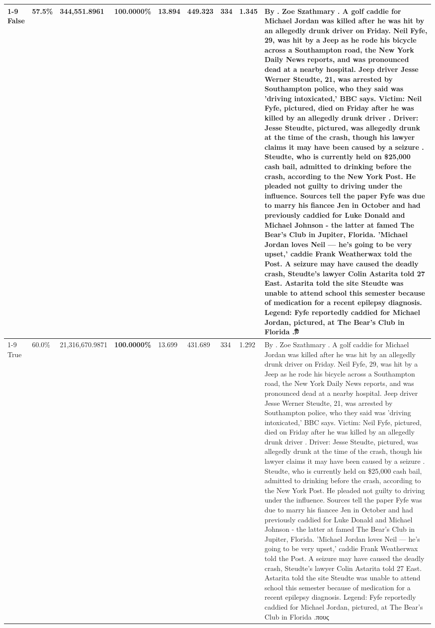 \begin{table}[H]
\begin{tabular}{lllrlllll}
\cline{1-9}
False & 57.5\% & 344,551.8961 & \bfseries \color{red} 100.0000\% & 13.894 & 449.323 & 334 & 1.345 & By . Zoe Szathmary . A golf caddie for Michael Jordan was killed after he was hit by an allegedly drunk driver on Friday. Neil Fyfe, 29, was hit by a Jeep as he rode his bicycle across a Southampton road, the New York Daily News reports, and was pronounced dead at a nearby hospital. Jeep driver Jesse Werner Steudte, 21, was arrested by Southampton police, who they said was 'driving intoxicated,' BBC says. Victim: Neil Fyfe, pictured, died on Friday after he was killed by an allegedly drunk driver . Driver: Jesse Steudte, pictured, was allegedly drunk at the time of the crash, though his lawyer claims it may have been caused by a seizure . Steudte, who is currently held on \$25,000 cash bail, admitted to drinking before the crash, according to the New York Post. He pleaded not guilty to driving under the influence. Sources tell the paper Fyfe was due to marry his fiancee Jen in October and had previously caddied for Luke Donald and Michael Johnson - the latter at famed The Bear's Club in Jupiter, Florida. 'Michael Jordan loves Neil — he’s going to be very upset,' caddie Frank Weatherwax told the Post. A seizure may have caused the deadly crash, Steudte's lawyer Colin Astarita told 27 East. Astarita told the site Steudte was unable to attend school this semester because of medication for a recent epilepsy diagnosis. Legend: Fyfe reportedly caddied for Michael Jordan, pictured, at The Bear's Club in Florida .টি \\
\cline{1-9}
True & 60.0\% & 21,316,670.9871 & \bfseries \color{red} 100.0000\% & 13.699 & 431.689 & 334 & 1.292 & By . Zoe Szathmary . A golf caddie for Michael Jordan was killed after he was hit by an allegedly drunk driver on Friday. Neil Fyfe, 29, was hit by a Jeep as he rode his bicycle across a Southampton road, the New York Daily News reports, and was pronounced dead at a nearby hospital. Jeep driver Jesse Werner Steudte, 21, was arrested by Southampton police, who they said was 'driving intoxicated,' BBC says. Victim: Neil Fyfe, pictured, died on Friday after he was killed by an allegedly drunk driver . Driver: Jesse Steudte, pictured, was allegedly drunk at the time of the crash, though his lawyer claims it may have been caused by a seizure . Steudte, who is currently held on \$25,000 cash bail, admitted to drinking before the crash, according to the New York Post. He pleaded not guilty to driving under the influence. Sources tell the paper Fyfe was due to marry his fiancee Jen in October and had previously caddied for Luke Donald and Michael Johnson - the latter at famed The Bear's Club in Jupiter, Florida. 'Michael Jordan loves Neil — he’s going to be very upset,' caddie Frank Weatherwax told the Post. A seizure may have caused the deadly crash, Steudte's lawyer Colin Astarita told 27 East. Astarita told the site Steudte was unable to attend school this semester because of medication for a recent epilepsy diagnosis. Legend: Fyfe reportedly caddied for Michael Jordan, pictured, at The Bear's Club in Florida .πους \\

\end{tabular}
\end{table}
